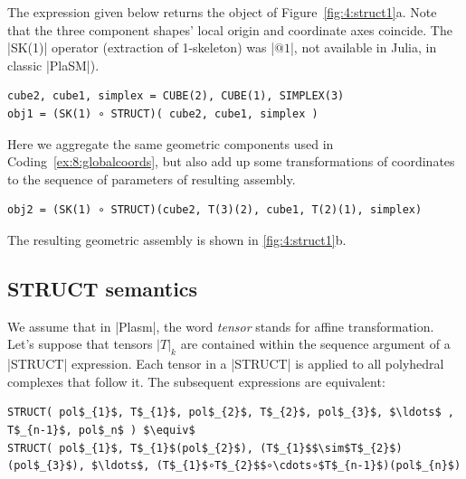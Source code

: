 \begin{coding}
\begin{coding}
The expression given below returns the
object of Figure~\ref{fig:4:struct1}a.  Note that the
three component shapes' local origin and coordinate axes
coincide.  The |SK(1)| operator (extraction of 1-skeleton)
was |$@1$|, not available in Julia, in classic |PlaSM|).
    
\begin{lstlisting}[language=JuliaLocal, style=julia, mathescape=true]
cube2, cube1, simplex = CUBE(2), CUBE(1), SIMPLEX(3)
obj1 = (SK(1) ∘ STRUCT)( cube2, cube1, simplex )
\end{lstlisting}
\label{ex:8:globalcoords}    
\end{coding}


\begin{coding} \label{coding:4:2}
Here we aggregate the same geometric components used in
Coding~\ref{ex:8:globalcoords}, but also add up some
transformations of coordinates to the sequence of parameters of resulting assembly.
\begin{lstlisting}[language=JuliaLocal, style=julia, mathescape=true]
obj2 = (SK(1) ∘ STRUCT)(cube2, T(3)(2), cube1, T(2)(1), simplex)
\end{lstlisting}
\label{ex:8:localcoords}
The resulting geometric assembly is shown in \ref{fig:4:struct1}b.  
\end{coding}


\subsection*{STRUCT semantics}
\label{sec:8:localcoords}

We assume that in |Plasm|, the word \emph{tensor} stands for affine transformation.
Let’s suppose that tensors $|T|_k$ are contained
within the sequence argument of a |STRUCT| expression.
Each tensor in a |STRUCT| is applied to all polyhedral
complexes that follow it. The subsequent expressions are equivalent:

\begin{lstlisting}[language=JuliaLocal, style=julia, mathescape=true]
STRUCT( pol$_{1}$, T$_{1}$, pol$_{2}$, T$_{2}$, pol$_{3}$, $\ldots$ , T$_{n-1}$, pol$_n$ ) $\equiv$ 
STRUCT( pol$_{1}$, T$_{1}$(pol$_{2}$), (T$_{1}$$\sim$T$_{2}$)(pol$_{3}$), $\ldots$, (T$_{1}$∘T$_{2}$$∘\cdots∘$T$_{n-1}$)(pol$_{n}$)
\end{lstlisting}


\end{coding}
